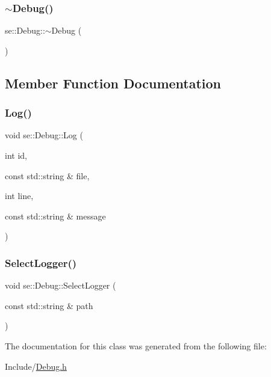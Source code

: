 \mbox{\label{classse_1_1_debug_a2ff6371c83b2a8918b15907bd1491ac9}} 
\subsubsection{\texorpdfstring{$\sim$\+Debug()}{~Debug()}}
{\footnotesize\ttfamily se\+::\+Debug\+::$\sim$\+Debug (\begin{DoxyParamCaption}{ }\end{DoxyParamCaption})}



\subsection{Member Function Documentation}
\mbox{\label{classse_1_1_debug_a682e9ff37514ccccfd063a1aff942e2d}} 
\subsubsection{\texorpdfstring{Log()}{Log()}}
{\footnotesize\ttfamily void se\+::\+Debug\+::\+Log (\begin{DoxyParamCaption}\item[{int}]{id,  }\item[{const std\+::string \&}]{file,  }\item[{int}]{line,  }\item[{const std\+::string \&}]{message }\end{DoxyParamCaption})}

\mbox{\label{classse_1_1_debug_ab97d44dca8606c2be2cb709f7e82be09}} 
\subsubsection{\texorpdfstring{Select\+Logger()}{SelectLogger()}}
{\footnotesize\ttfamily void se\+::\+Debug\+::\+Select\+Logger (\begin{DoxyParamCaption}\item[{const std\+::string \&}]{path }\end{DoxyParamCaption})}



The documentation for this class was generated from the following file\+:\begin{DoxyCompactItemize}
\item 
Include/\mbox{\hyperlink{_debug_8h}{Debug.\+h}}\end{DoxyCompactItemize}
